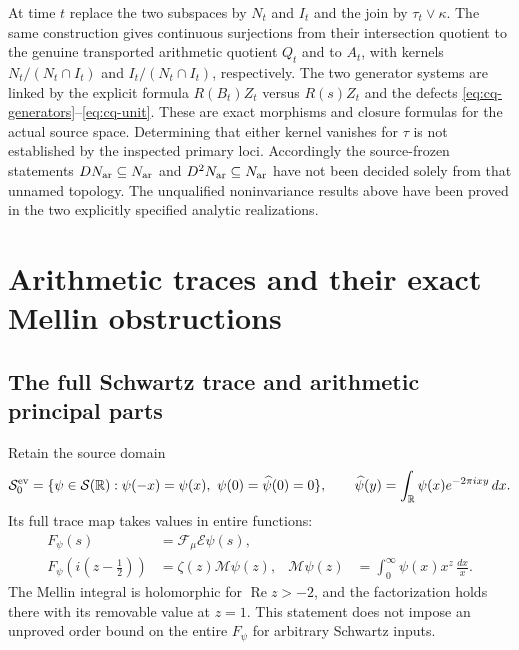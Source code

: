 At time $t$ replace the two subspaces by $N_t$ and $I_t$ and the
join by $\tau_t\vee\kappa$. The same construction gives continuous
surjections from their intersection quotient to the genuine transported
arithmetic quotient $Q_t$ and to $A_t$, with kernels
$N_t/(N_t\cap I_t)$ and $I_t/(N_t\cap I_t)$, respectively.
The two generator systems are linked by the explicit formula
$R(B_t)Z_t$ versus $R(s)Z_t$ and the defects
\eqref{eq:cq-generators}--\eqref{eq:cq-unit}.
These are exact morphisms and closure formulas for the actual source
space. Determining that either kernel vanishes for $\tau$ is not
established by the inspected primary loci. Accordingly the
source-frozen statements $DN_{\rm ar}\subseteq N_{\rm ar}$ and
$D^2N_{\rm ar}\subseteq N_{\rm ar}$ have not been decided solely from that
unnamed topology. The unqualified noninvariance results above have
been proved in the two explicitly specified analytic realizations.

\section{Arithmetic traces and their exact Mellin obstructions}
\label{sec:cq-arithmetic}
\subsection{The full Schwartz trace and arithmetic principal parts}
\label{sec:cq-principalparts}
Retain the source domain
\[
 \mathcal S_0^{\rm ev}
 =\{\psi\in\mathcal S(\mathbb R):
       \psi(-x)=\psi(x),\ \psi(0)=\widehat\psi(0)=0\},
 \qquad
 \widehat\psi(y)=\int_{\mathbb R}\psi(x)e^{-2\pi ixy}\,dx.
\]
Its full trace map takes values in entire functions:
\begin{equation}\label{eq:cq-Schwartz-trace}
 \begin{aligned}
 F_\psi(s)&=\mathcal F_\mu\mathcal E\psi(s),\\
 F_\psi(i(z-\tfrac12))&=\zeta(z)\mathcal M\psi(z),
 &\mathcal M\psi(z)&=\int_0^\infty\psi(x)x^z\,\frac{dx}{x}.
 \end{aligned}
\end{equation}
The Mellin integral is holomorphic for $\operatorname{Re}z>-2$,
and the factorization holds there with its removable value at
$z=1$. This statement does not impose an unproved order bound
on the entire $F_\psi$ for arbitrary Schwartz inputs.

